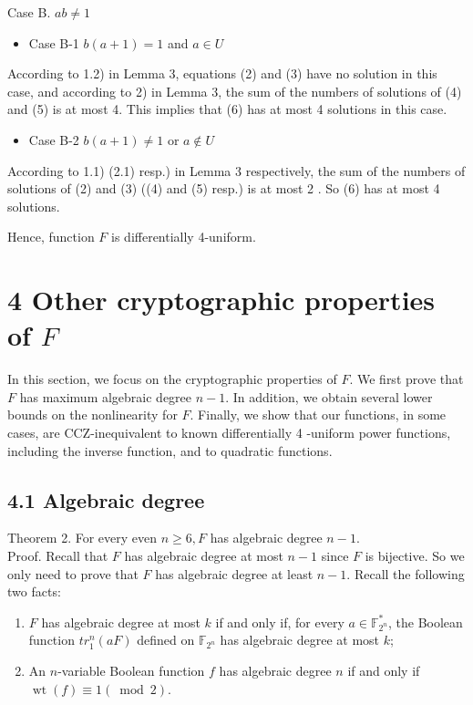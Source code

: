 \documentclass[10pt]{article}
\begin{document}
Case B. $a b \neq 1$

\begin{itemize}
  \item Case B-1 $b(a+1)=1$ and $a \in U$
\end{itemize}

According to 1.2) in Lemma 3, equations (2) and (3) have no solution in this case, and according to 2) in Lemma 3, the sum of the numbers of solutions of (4) and (5) is at most 4. This implies that (6) has at most 4 solutions in this case.

\begin{itemize}
  \item Case B-2 $b(a+1) \neq 1$ or $a \notin U$
\end{itemize}

According to 1.1) (2.1) resp.) in Lemma 3 respectively, the sum of the numbers of solutions of (2) and (3) ((4) and (5) resp.) is at most 2 . So (6) has at most 4 solutions.

Hence, function $F$ is differentially 4-uniform.

\section*{4 Other cryptographic properties of $F$}
In this section, we focus on the cryptographic properties of $F$. We first prove that $F$ has maximum algebraic degree $n-1$. In addition, we obtain several lower bounds on the nonlinearity for $F$. Finally, we show that our functions, in some cases, are CCZ-inequivalent to known differentially 4 -uniform power functions, including the inverse function, and to quadratic functions.

\subsection*{4.1 Algebraic degree}
Theorem 2. For every even $n \geq 6, F$ has algebraic degree $n-1$.\\
Proof. Recall that $F$ has algebraic degree at most $n-1$ since $F$ is bijective. So we only need to prove that $F$ has algebraic degree at least $n-1$. Recall the following two facts:

\begin{enumerate}
  \item $F$ has algebraic degree at most $k$ if and only if, for every $a \in \mathbb{F}_{2^{n}}^{*}$, the Boolean function $t r_{1}^{n}(a F)$ defined on $\mathbb{F}_{2^{n}}$ has algebraic degree at most $k$;
  \item An $n$-variable Boolean function $f$ has algebraic degree $n$ if and only if $\operatorname{wt}(f) \equiv 1 (\bmod 2)$.
\end{enumerate}
\end{document}
